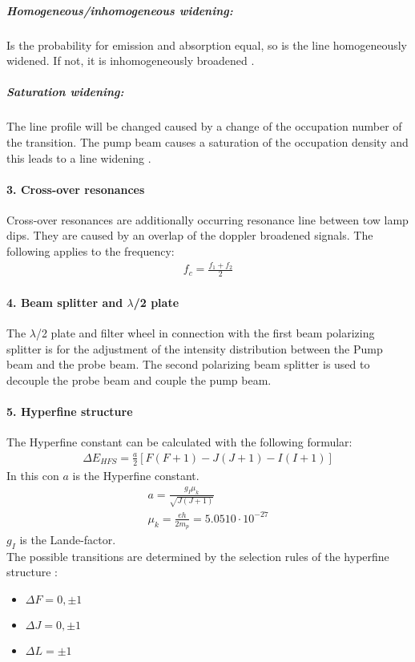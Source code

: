 \subparagraph{Homogeneous/inhomogeneous widening:}
Is the probability for emission and absorption equal, so is the line homogeneously widened. If not, it is inhomogeneously broadened \citep{LSDem}.

\subparagraph{Saturation widening:}
The line profile will be changed caused by a change of the occupation number of the transition. The pump beam causes a saturation of the occupation density and this leads to a line widening \citep{LSDem}.

\paragraph{3. Cross-over resonances}
Cross-over resonances are additionally occurring resonance line between tow lamp dips. They are caused by an overlap of the doppler broadened signals. The following applies to the frequency: 
\begin{align}
    f_c = \frac{f_1 + f_2}{2}
\end{align}


\paragraph{4. Beam splitter and $\lambda$/2 plate}
The $\lambda$/2 plate and filter wheel in connection with the first beam polarizing splitter is for the adjustment of the intensity distribution between the Pump beam and the probe beam. The second polarizing beam splitter is used to decouple the probe beam and couple the pump beam.

\paragraph{5. Hyperfine structure}
The Hyperfine constant can be calculated with the following formular: 
\begin{align}
    \Delta E_{HFS} = \frac{a}{2} [F(F+1) - J(J+1) - I(I+1)]
\end{align}
In this con $a$ is the Hyperfine constant.
\begin{align}
    a = \frac{g_I \mu_k}{\sqrt{J(J+1)}} \\
    \mu_k = \frac{eh}{2m_p} = 5.0510 \cdot 10^{-27}
\end{align}
$g_I$ is the Lande-factor.\\
The possible transitions are determined by the selection rules of the hyperfine structure \citep{Dem}: 
\begin{itemize}
    \item $\Delta F = 0, \pm 1$
    \item $\Delta J = 0, \pm 1$
    \item $\Delta L = \pm 1$
\end{itemize}